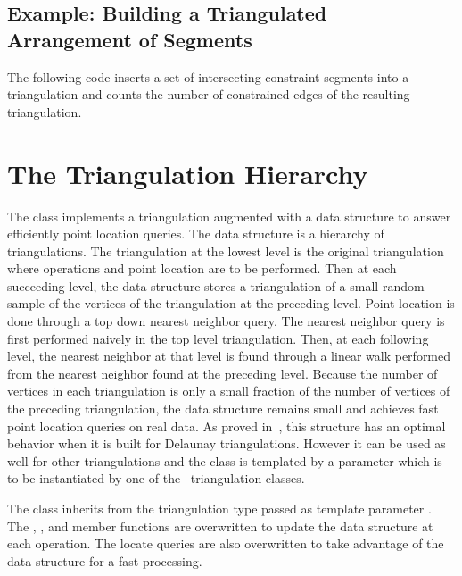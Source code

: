 \subsection{Example: Building a Triangulated Arrangement of Segments}

The following code inserts a set of intersecting constraint segments
into a triangulation 
and counts the number of constrained edges of the
resulting triangulation.






\section{The Triangulation Hierarchy\label{Section_2D_Triangulations_Hierarchy}}


The class 
implements a triangulation augmented with
a data structure to answer efficiently  point location queries.
The data structure is a hierarchy 
of triangulations. The triangulation at the lowest level is
the original triangulation where operations and point location are to 
be performed.
Then at each succeeding level, the data structure
stores a triangulation of a small random sample of the vertices
of the triangulation at the preceding level. Point location
is done through a top down nearest neighbor query.
The nearest neighbor query is first
performed naively in the top level triangulation.
Then, at each following level, the nearest neighbor at that level
is found through a linear walk performed from
the nearest neighbor found at the preceding level.
Because the number of vertices in each triangulation is only a small
fraction of the number of vertices of the preceding triangulation,
the data structure remains small and achieves fast point location 
queries  on real
data. As proved in~\cite{d-iirdt-98}, this structure has an optimal behavior
when it is built for Delaunay triangulations.
However it can be used as well for other triangulations
and the class  is templated by a parameter
which is to be instantiated by one of the \cgal\ triangulation
classes. 

The class  inherits from the
triangulation type passed as template parameter . 
The , , and  member functions
are  overwritten to update the data structure at each operation.
The locate queries are also overwritten to take advantage of the data
structure for a fast processing.

